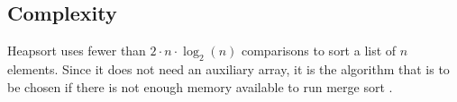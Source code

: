 \subsection{Complexity}
Heapsort uses fewer than $2 \cdot n \cdot \log_2(n)$ comparisons to sort a list of $n$ elements.  Since it does
not need an auxiliary array, it is the algorithm that is to be chosen if there is not enough memory available
to run merge sort \cite{sedgewick:2011}.  


